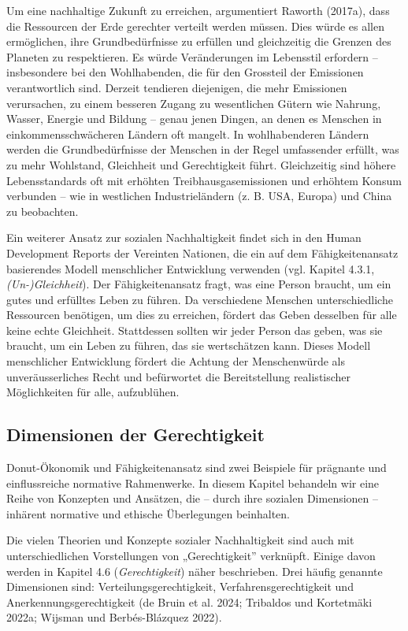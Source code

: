 \documentclass[
  nswissgerman,
  a4paper,
  DIV=11,
  numbers=noendperiod,
  oneside,
  openany]{scrreprt}
\begin{document}
Um eine nachhaltige Zukunft zu erreichen, argumentiert Raworth (2017a),
dass die Ressourcen der Erde gerechter verteilt werden müssen. Dies
würde es allen ermöglichen, ihre Grundbedürfnisse zu erfüllen und
gleichzeitig die Grenzen des Planeten zu respektieren. Es würde
Veränderungen im Lebensstil erfordern -- insbesondere bei den
Wohlhabenden, die für den Grossteil der Emissionen verantwortlich sind.
Derzeit tendieren diejenigen, die mehr Emissionen verursachen, zu einem
besseren Zugang zu wesentlichen Gütern wie Nahrung, Wasser, Energie und
Bildung -- genau jenen Dingen, an denen es Menschen in
einkommensschwächeren Ländern oft mangelt. In wohlhabenderen Ländern
werden die Grundbedürfnisse der Menschen in der Regel umfassender
erfüllt, was zu mehr Wohlstand, Gleichheit und Gerechtigkeit führt.
Gleichzeitig sind höhere Lebensstandards oft mit erhöhten
Treibhausgasemissionen und erhöhtem Konsum verbunden -- wie in
westlichen Industrieländern (z. B. USA, Europa) und China zu beobachten.

Ein weiterer Ansatz zur sozialen Nachhaltigkeit findet sich in den Human
Development Reports der Vereinten Nationen, die ein auf dem
Fähigkeitenansatz basierendes Modell menschlicher Entwicklung verwenden
(vgl. Kapitel 4.3.1, \emph{(Un-)Gleichheit}). Der Fähigkeitenansatz
fragt, was eine Person braucht, um ein gutes und erfülltes Leben zu
führen. Da verschiedene Menschen unterschiedliche Ressourcen benötigen,
um dies zu erreichen, fördert das Geben desselben für alle keine echte
Gleichheit. Stattdessen sollten wir jeder Person das geben, was sie
braucht, um ein Leben zu führen, das sie wertschätzen kann. Dieses
Modell menschlicher Entwicklung fördert die Achtung der Menschenwürde
als unveräusserliches Recht und befürwortet die Bereitstellung
realistischer Möglichkeiten für alle, aufzublühen.

\subsection{Dimensionen der
Gerechtigkeit}\label{dimensionen-der-gerechtigkeit}

Donut-Ökonomik und Fähigkeitenansatz sind zwei Beispiele für prägnante
und einflussreiche normative Rahmenwerke. In diesem Kapitel behandeln
wir eine Reihe von Konzepten und Ansätzen, die -- durch ihre sozialen
Dimensionen -- inhärent normative und ethische Überlegungen beinhalten.

Die vielen Theorien und Konzepte sozialer Nachhaltigkeit sind auch mit
unterschiedlichen Vorstellungen von „Gerechtigkeit'' verknüpft. Einige
davon werden in Kapitel 4.6 (\emph{Gerechtigkeit}) näher beschrieben.
Drei häufig genannte Dimensionen sind: Verteilungsgerechtigkeit,
Verfahrensgerechtigkeit und Anerkennungsgerechtigkeit ({de Bruin et al.}
2024; Tribaldos und Kortetmäki 2022a; Wijsman und Berbés-Blázquez 2022).
\end{document}
